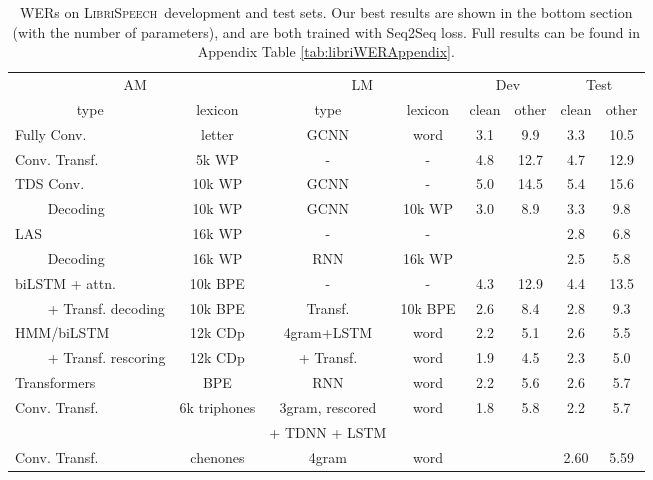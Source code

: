 \documentclass{article}
\newcommand{\librispeech}{\textsc{LibriSpeech}}
\begin{document}
\begin{table*}[!t]
\caption{WERs on \librispeech~development and test sets. Our best results are shown in the bottom section (with the number of parameters), and are both trained with Seq2Seq loss. Full results can be found in Appendix Table \ref{tab:libriWERAppendix}.\label{tab:libriWER}}
\vskip 0.1in
\begin{small}
    \centering
    \begin{sc}
    \begin{tabular}{lccccccc}
    \toprule
       \multicolumn{2}{c}{AM} & \multicolumn{2}{c}{LM} & \multicolumn{2}{c}{Dev} & \multicolumn{2}{c}{Test} \\
    \cmidrule(lr){1-2} \cmidrule(lr){3-4} \cmidrule(lr){5-6} \cmidrule(lr){7-8}
        \multicolumn{1}{c}{type} & lexicon & type  & lexicon& clean & other & clean & other \\
    \midrule
    Fully Conv. \cite{zeghidour2018fullyconv} & letter & GCNN & word & 3.1 & 9.9 & 3.3 & 10.5 \\
    Conv. Transf. \cite{mohamed2019transformers} & 5k WP & - & - & 4.8 & 12.7 & 4.7 & 12.9 \\
    TDS Conv. \cite{hannun2019TDS} & 10k WP & GCNN & - & 5.0 & 14.5 & 5.4 & 15.6 \\
    ~~~~ Decoding & 10k WP & GCNN & 10k WP & 3.0 & 8.9 & 3.3 & 9.8 \\
    LAS \cite{park2019specaug} & 16k WP & - & - & & & 2.8 & 6.8 \\
    ~~~~ Decoding & 16k WP & RNN & 16k WP & & & 2.5 & 5.8 \\
    biLSTM + attn. \cite{luscher2019transformers} & 10k BPE & - & - & 4.3 & 12.9 & 4.4 & 13.5 \\
    ~~~~ + Transf. decoding & 10k BPE & Transf. & 10k BPE & 2.6 & 8.4 & 2.8 & 9.3 \\
    HMM/biLSTM \cite{luscher2019transformers} & 12k CDp & 4gram+LSTM & word & 2.2 & 5.1 & 2.6 & 5.5 \\
    ~~~~ + Transf. rescoring & 12k CDp & + Transf. & word & 1.9 & 4.5 & 2.3 & 5.0 \\
    Transformers \cite{karita2019comparative} & BPE & RNN & word & 2.2 & 5.6 & 2.6 & 5.7 \\
    Conv. Transf. \cite{han2019stateoftheart} & 6k triphones & 3gram, rescored & word & 1.8 & 5.8 & 2.2 & 5.7 \\
     & & + TDNN + LSTM& & & & & \\
    Conv. Transf. \cite{wang2019transformerbased} & chenones & 4gram & word &  &  & 2.60 & 5.59 \\

\end{tabular}
\end{sc}
\end{small}
\end{table*}
\end{document}
